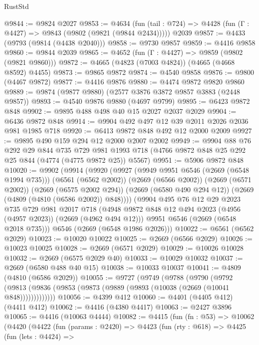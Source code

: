 \begin{lexlean}{RustStd}
\begin{coremodule}
@9844 := @9824 @2027
@9853 := @4634
    (fun (tail : @724) => @4428 (fun (Γ : @4427) => @9843 (@9802 (@9821 (@9844 @2434)))))
    @2039
@9857 := @4433 (@9793 (@9814 (@4438 @2040)))
@9858 := @9730 @9857
@9859 := @4416 @9858
@9860 := @9844 @2039
@9865 := @4652 (fun (Γ : @4427) => @9859 (@9802 (@9821 @9860)))
@9872 := @4665 (@4823 (@7003 @4824)) (@4665 (@4668 @8592) @4455)
@9873 := @9865 @9872
@9874 := @4540 @9858
@9876 := @9800 (@4467 @9872)
@9877 := @4416 @9876
@9880 := @4474 @9872 @9820 @9860
@9889 := @9874 (@9877 @9880) (@2577 @3876 @3872 @9857 @3883 (@2448 @9857))
@9893 := @4540 @9876 @9880 (@4697 @9799)
@9895 := @6423 @9872 @848
@9902 := @9895 @488 @498 @40 @15 @2027 @2037 @2029
@9904 := @6436 @9872 @848
@9914 := @9904 @492 @497 @12 @39 @2011 @2026 @2036 @981 @1985 @718
@9920 := @6413 @9872 @848 @492 @12 @2000 @2009
@9927 := @9895 @490 @159 @294 @12 @2000 @2007 @2002
@9949 := @9904
    @88
    @76
    @292
    @29
    @844
    @735
    @729
    @981
    @1993
    @718
    (@4766 @9872 @848 @25 @292 @25 @844 (@4774 (@4775 @9872 @25)) @5567)
@9951 := @5906 @9872 @848
@10020 := @9902
    (@9914
      (@9920
        (@9927
          (@9949 @9951 @6546 (@2669 (@6548 @1994 @735)))
          (@6561 (@6562 @2002))
          (@2669 (@6566 @2002))
          (@2669 (@6571 @2002))
          (@2669 (@6575 @2002 @294))
          (@2669 (@6580 @490 @294 @12))
          (@2669 (@4809 (@4810 (@6586 @2002)) @848))))
      (@9904
        @495
        @76
        @12
        @29
        @2023
        @735
        @729
        @981
        @2017
        @718
        (@4948 @9872 @848 @12 @494 @2023 (@4956 (@4957 @2023)) (@2669 (@4962 @494 @12)))
        @9951
        @6546
        (@2669 (@6548 @2018 @735)))
      @6546
      (@2669 (@6548 @1986 @2026)))
@10022 := @6561 (@6562 @2029)
@10023 := @10020 @10022
@10025 := @2669 (@6566 @2029)
@10026 := @10023 @10025
@10028 := @2669 (@6571 @2029)
@10029 := @10026 @10028
@10032 := @2669 (@6575 @2029 @40)
@10033 := @10029 @10032
@10037 := @2669 (@6580 @488 @40 @15)
@10038 := @10033 @10037
@10041 := @4809 (@4810 (@6586 @2029))
@10055 := @9727
    (@9749
      (@9788
        (@9790
          (@9792 (@9813 (@9836 (@9853 (@9873 (@9889 (@9893 (@10038 (@2669 (@10041 @848)))))))))))))
@10056 := @4399 @412
@10060 := @4401 (@4405 @412) (@4411 @412)
@10062 := @4416 (@4380 @4417)
@10063 := @2427 @3896
@10065 := @4416 (@10063 @4444)
@10082 := @4415
    (fun (fn : @53) =>
    @10062
      (@4420
        (@4422
          (fun (params : @2420) =>
          @4423
            (fun (rty : @618) =>
            @4425
              (fun (lets : @4424) =>

\end{coremodule}
\end{lexlean}
